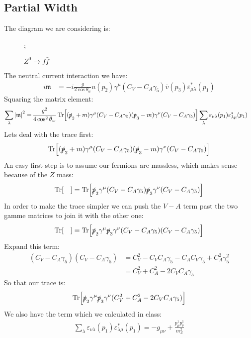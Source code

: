 \documentclass[12pt]{article}
\newcommand{\g}{\gamma}
\renewcommand{\u}[1]{{u(#1)}}
\renewcommand{\vb}[1]{{\bar v(#1)}}
\newcommand{\sla}[1]{\slashed{#1}}
\newcommand{\munu}{{\mu\nu}}
\newcommand{\veps}{\varepsilon}
\begin{document}
\subsection{Partial Width}
The diagram we are considering is:
\begin{figure}[H]
  \centering
  ;
  \caption{$Z^0\to f\bar f$}
  \label{fig:2}
\end{figure}
The neutral current interaction we have:
\begin{align*}
  i\mathfrak{m}&=-i\frac{g}{2\cos\theta_w}\u{p_2}\g^\mu(C_V-C_A\g_5)\vb{p_3}
  \veps_{\mu\lambda}^*(p_1)
\end{align*}
Squaring the matrix element:
\begin{align*}
  \sum_{\lambda}\abs{\mathfrak{m}}^2=\,&\frac{g^2}{4\cos^2\theta_w}
  \Tr[(\sla{p}_2+m)\g^\mu(C_V-C_A\g_5)(\sla{p}_3-m)\g^\nu(C_V-C_A\g_5)] \sum_\lambda\veps_{\nu\lambda}(p_1)\veps_{\lambda\mu}^*(p_1)
\end{align*}
Lets deal with the trace first:
\begin{align*}
  \Tr[(\sla{p}_2+m)\g^\mu(C_V-C_A\g_5)(\sla{p}_3-m)\g^\nu(C_V-C_A\g_5)]
\end{align*}
An easy first step is to assume our fermions are massless, which makes sense because of the $Z$ mass:
\begin{align*}
  \Tr[\quad]=\Tr[\sla{p}_2\g^\mu(C_V-C_A\g_5)\sla{p}_3\g^\nu(C_V-C_A\g_5)]
\end{align*}
In order to make the trace simpler we can push the $V-A$ term past the two gamme matrices to join it with the other one:
\begin{align*}
  \Tr[\quad]=\Tr[\sla{p}_2\g^\mu\sla{p}_3\g^\nu(C_V-C_A\g_5)(C_V-C_A\g_5)]
\end{align*}
Expand this term:
\begin{align*}
  (C_V-C_A\g_5)(C_V-C_A\g_5)&=C_V^2-C_VC_A\g_5-C_AC_V\g_5+C_A^2\g_5^2\\
  &=C_V^2+C_A^2-2C_VC_A\g_5
\end{align*}
So that our trace is:
\begin{align*}
  \Tr[\sla{p}_2\g^\mu\sla{p}_3\g^\nu(C_V^2+C_A^2-2C_VC_A\g_5)]
\end{align*}
We also have the term which we calculated in class:
\begin{align*}
  \sum_\lambda\veps_{\nu\lambda}(p_1)\veps_{\lambda\mu}^*(p_1)
  =-g_\munu+\frac{p^1_\mu p^1_\nu}{m_Z^2}
\end{align*}
\end{document}
